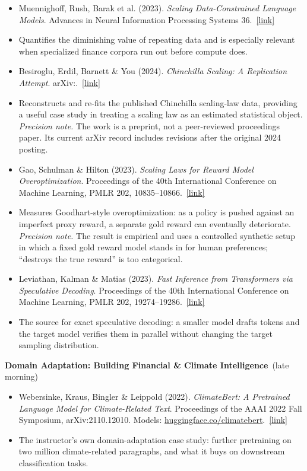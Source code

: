 \documentclass[11pt]{article}
\newcommand{\reading}[5]{%
  \item #1. \textit{#2}. #3.\ \href{#4}{[link]}%
}
\newcommand{\session}[2]{\smallskip\noindent\textbf{\color{accent}#1}\ {\small\color{notegray}(#2)}\par\nopagebreak\smallskip}
\newcommand{\pnote}[1]{\\[2pt]\textit{Precision note.} #1}
\begin{document}
\begin{itemize}
  \reading{Muennighoff, Rush, Barak et al. (2023)}{Scaling Data-Constrained Language Models}{Advances in Neural Information Processing Systems 36}{https://openreview.net/forum?id=j5BuTrEj35}{}
  \item[] {\small\color{notegray}Quantifies the diminishing value of repeating data and is especially relevant when specialized finance corpora run out before compute does.}
  \reading{Besiroglu, Erdil, Barnett \& You (2024)}{Chinchilla Scaling: A Replication Attempt}{arXiv:\allowbreak 2404.10102}{https://arxiv.org/abs/2404.10102}{}
  \item[] {\small\color{notegray}Reconstructs and re-fits the published Chinchilla scaling-law data, providing a useful case study in treating a scaling law as an estimated statistical object.\pnote{The work is a preprint, not a peer-reviewed proceedings paper. Its current arXiv record includes revisions after the original 2024 posting.}}
  \reading{Gao, Schulman \& Hilton (2023)}{Scaling Laws for Reward Model Overoptimization}{Proceedings of the 40th International Conference on Machine Learning, PMLR 202, 10835--10866}{https://proceedings.mlr.press/v202/gao23h.html}{}
  \item[] {\small\color{notegray}Measures Goodhart-style overoptimization: as a policy is pushed against an imperfect proxy reward, a separate gold reward can eventually deteriorate.\pnote{The result is empirical and uses a controlled synthetic setup in which a fixed gold reward model stands in for human preferences; ``destroys the true reward'' is too categorical.}}
  \reading{Leviathan, Kalman \& Matias (2023)}{Fast Inference from Transformers via Speculative Decoding}{Proceedings of the 40th International Conference on Machine Learning, PMLR 202, 19274--19286}{https://proceedings.mlr.press/v202/leviathan23a.html}{}
  \item[] {\small\color{notegray}The source for exact speculative decoding: a smaller model drafts tokens and the target model verifies them in parallel without changing the target sampling distribution.}
\end{itemize}

\session{Domain Adaptation: Building Financial \& Climate Intelligence}{late morning}

\begin{itemize}
  \reading{Webersinke, Kraus, Bingler \& Leippold (2022)}{ClimateBert: A Pretrained Language Model for Climate-Related Text}{Proceedings of the AAAI 2022 Fall Symposium, arXiv:2110.12010. Models: \href{https://huggingface.co/climatebert}{huggingface.co/climatebert}}{https://arxiv.org/abs/2110.12010}{}
  \item[] {\small\color{notegray}The instructor's own domain-adaptation case study: further pretraining on two million climate-related paragraphs, and what it buys on downstream classification tasks.}
\end{itemize}
\end{document}
